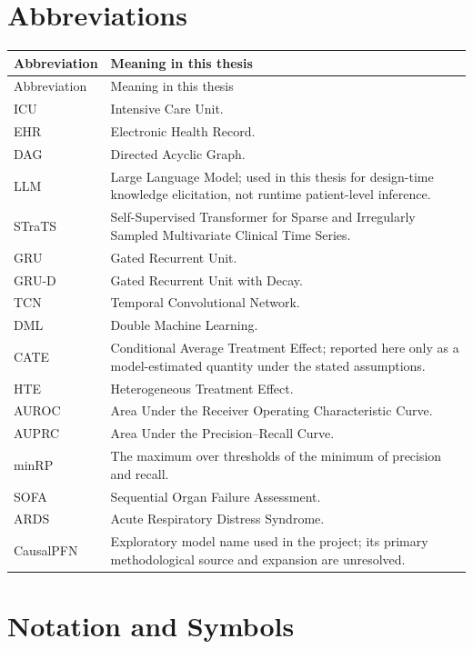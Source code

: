 \chapter*{Abbreviations}

\begin{longtable}{@{}L{0.20\textwidth}L{0.72\textwidth}@{}}
\toprule
Abbreviation & Meaning in this thesis \\
\midrule
\endfirsthead
\toprule
Abbreviation & Meaning in this thesis \\
\midrule
\endhead
\bottomrule
\endfoot
ICU & Intensive Care Unit. \\
EHR & Electronic Health Record. \\
DAG & Directed Acyclic Graph. \\
LLM & Large Language Model; used in this thesis for design-time knowledge elicitation, not runtime patient-level inference. \\
STraTS & Self-Supervised Transformer for Sparse and Irregularly Sampled Multivariate Clinical Time Series. \\
GRU & Gated Recurrent Unit. \\
GRU-D & Gated Recurrent Unit with Decay. \\
TCN & Temporal Convolutional Network. \\
DML & Double Machine Learning. \\
CATE & Conditional Average Treatment Effect; reported here only as a model-estimated quantity under the stated assumptions. \\
HTE & Heterogeneous Treatment Effect. \\
AUROC & Area Under the Receiver Operating Characteristic Curve. \\
AUPRC & Area Under the Precision--Recall Curve. \\
minRP & The maximum over thresholds of the minimum of precision and recall. \\
SOFA & Sequential Organ Failure Assessment. \\
ARDS & Acute Respiratory Distress Syndrome. \\
CausalPFN & Exploratory model name used in the project; its primary methodological source and expansion are unresolved. \\
\end{longtable}

\clearpage
\chapter*{Notation and Symbols}

